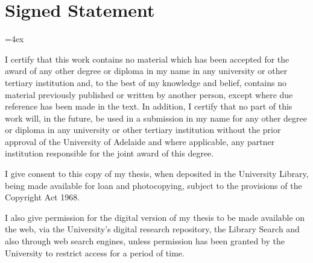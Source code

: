\chapter{Signed Statement}
 {\parindent=0pt\parskip=4ex




  I certify that this work contains no material which has been accepted for the award of any other degree or diploma in my name in any university or other tertiary institution and, to the best of my knowledge and belief, contains no material previously published or written by another person, except where due reference has been made in the text. In addition, I certify that no part of this work will, in the future, be used in a submission in my name for any other degree or diploma in any university or other tertiary institution without the prior approval of the University of Adelaide and where applicable, any partner institution responsible for the joint award of this degree.

  I give consent to this copy of my thesis, when deposited in the University Library, being made available for loan and photocopying, subject to the provisions of the Copyright Act 1968.

  I also give permission for the digital version of my thesis to be made available on the web, via the University's digital research repository, the Library Search and also through web search engines, unless permission has been granted by the University to restrict access for a period of time.


}
